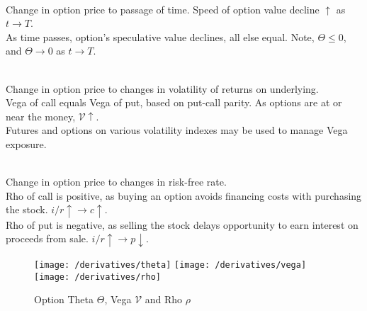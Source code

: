 \begin{definition} \\
Change in option price to passage of time. Speed of option value decline $\uparrow$ as $t \rightarrow T$.\\
As time passes, option's speculative value declines, all else equal. Note, $\Theta \leq 0$, and $\Theta \rightarrow 0$ as $t \rightarrow T$.
\end{definition}

\begin{definition} \\
Change in option price to changes in volatility of returns on underlying.\\
Vega of call equals Vega of put, based on put-call parity. As options are at or near the money, $\mathcal{V} \uparrow$.\\
Futures and options on various volatility indexes may be used to manage Vega exposure.
\end{definition}

\begin{definition} \\
Change in option price to changes in risk-free rate.\\
Rho of call is positive, as buying an option avoids financing costs with purchasing the stock. $i/r \uparrow \rightarrow c \uparrow$.\\
Rho of put is negative, as selling the stock delays opportunity to earn interest on proceeds from sale. $i/r \uparrow \rightarrow p \downarrow$.
\end{definition}

\begin{figure}[H]
\centering
\texttt{[image: /derivatives/theta]}
\texttt{[image: /derivatives/vega]}
\texttt{[image: /derivatives/rho]}
\caption{Option Theta $\Theta$, Vega $\mathcal{V}$ and Rho $\rho$}
\end{figure}

